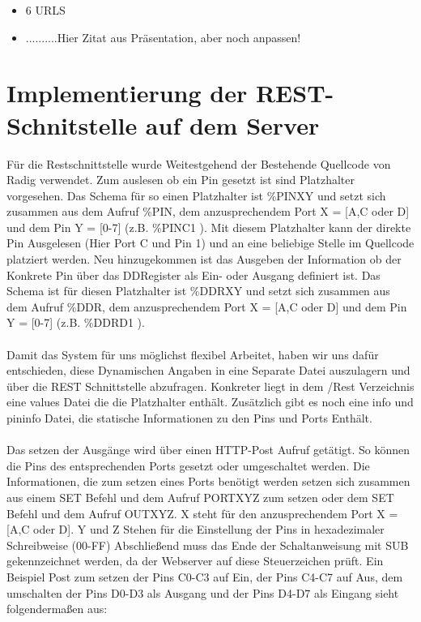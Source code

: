 \begin{itemize}
	\item 6 URLS
	\item ..........Hier Zitat aus Präsentation, aber noch anpassen!
\end{itemize}
	
\section{Implementierung der REST-Schnitstelle auf dem Server}

Für die Restschnittstelle wurde Weitestgehend der Bestehende Quellcode von Radig
verwendet. Zum auslesen ob ein Pin gesetzt ist sind Platzhalter vorgesehen.
Das Schema für so einen Platzhalter ist \textrm{\%PINXY} und setzt sich zusammen aus dem
Aufruf \textrm{\%PIN}, dem anzusprechendem Port X = [A,C oder D] und dem Pin Y = [0-7] (z.B.
\textrm{\%PINC1 } ). Mit diesem Platzhalter kann der direkte Pin Ausgelesen
(Hier Port C und Pin 1) und an eine beliebige Stelle im Quellcode platziert werden. Neu
hinzugekommen ist das Ausgeben der Information ob der Konkrete Pin über das
DDRegister als Ein- oder Ausgang definiert ist. Das Schema ist für diesen
Platzhalter ist \textrm{\%DDRXY} und setzt sich zusammen aus dem Aufruf \textrm{\%DDR}, dem
anzusprechendem Port X = [A,C oder D] und dem Pin Y = [0-7] (z.B.
\textrm{\%DDRD1} ). \\
\\
Damit das System für uns möglichst flexibel Arbeitet, haben wir uns dafür
entschieden, diese Dynamischen Angaben in eine Separate Datei auszulagern und
über die REST Schnittstelle abzufragen. Konkreter liegt in dem /Rest
Verzeichnis eine \textrm{values} Datei die die Platzhalter enthält. Zusätzlich
gibt es noch eine \textrm{info} und \textrm{pininfo} Datei, die statische
Informationen zu den Pins und Ports Enthält. \\
\\
Das setzen der Ausgänge wird über einen HTTP-Post Aufruf getätigt. So können die
Pins des entsprechenden Ports gesetzt oder umgeschaltet werden. Die
Informationen, die zum setzen eines Ports benötigt werden setzen sich zusammen
aus einem \textrm{SET} Befehl und dem Aufruf PORTXYZ zum setzen oder dem
\textrm{SET} Befehl und dem Aufruf OUTXYZ. X steht für den anzusprechendem Port
X = [A,C oder D]. Y und Z Stehen für die Einstellung der Pins in hexadezimaler
Schreibweise (00-FF) Abschließend muss das Ende der Schaltanweisung mit
\textrm{SUB} gekennzeichnet werden, da der Webserver auf diese Steuerzeichen
prüft. Ein Beispiel Post zum setzen der Pins C0-C3 auf Ein, der Pins C4-C7 auf
Aus, dem umschalten der Pins D0-D3 als Ausgang und der Pins D4-D7 als Eingang
sieht folgendermaßen aus:
\\

